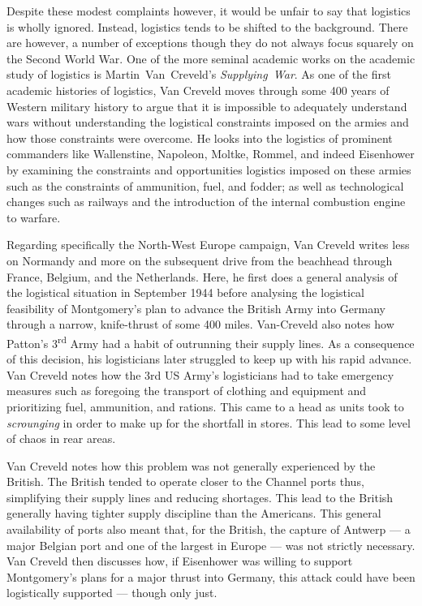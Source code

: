 \documentclass[noraggedright]{turabian-researchpaper}
\begin{document}
Despite these modest complaints however, it would be unfair to say that 
logistics is wholly ignored.  Instead, logistics tends to be shifted to the 
background.  There are however, a number of exceptions though they do not 
always focus squarely on the Second World War.  One of the more seminal 
academic works on the academic study of logistics is \mbox{Martin Van 
Creveld's} \mbox{\textit{Supplying War}}.  As one of the first academic 
histories of logistics, Van Creveld moves through some 400 years of Western 
military history to argue that it is impossible to adequately understand wars 
without understanding the logistical constraints imposed on the 
armies and how those constraints were overcome.\autocite[3]{sup-war}
He looks into the logistics of prominent commanders like Wallenstine, 
Napoleon, Moltke, Rommel, and indeed Eisenhower by examining the constraints 
and opportunities logistics imposed on these armies such as the constraints 
of ammunition, fuel, and fodder; as well as technological changes such as
railways and the introduction of the internal combustion engine to 
warfare.\autocite[1-3, 81-2, 86-96, 124-8, 234-5]{sup-war} 

Regarding specifically the North-West Europe campaign, Van Creveld writes 
less on Normandy and more on the subsequent drive from the beachhead through
France, Belgium, and the Netherlands.  Here, he first does a general
analysis of the logistical situation in September 1944 before analysing the
logistical feasibility of Montgomery's plan to advance the British Army into
Germany through a narrow, knife-thrust of some 400 miles.  
Van-Creveld also notes how Patton's 3\textsuperscript{rd} Army had a habit of 
outrunning
their supply lines.  As a consequence of this decision, his logisticians later
struggled to keep up with his rapid advance.  Van Creveld notes how the 3rd US 
Army's logisticians had to take emergency measures such as foregoing the 
transport of clothing and equipment and prioritizing fuel, ammunition, and 
rations.\autocite[217-22]{sup-war} This came to a head as units took to 
\textit{scrounging} in order to make up for the shortfall in stores. This 
lead to some level of chaos in rear areas. 

Van Creveld notes how this problem was not generally experienced by the 
British.  The British tended to operate closer to the Channel ports thus,
simplifying their supply lines and reducing shortages.  This 
lead to the British generally having tighter supply discipline than the 
Americans.\autocite[221--2]{sup-war}
This general availability of ports also meant that, for the British, the 
capture of Antwerp --- a major Belgian port and one of the largest in Europe 
--- was not strictly necessary.\autocite[223--5]{sup-war}
Van Creveld then discusses how, if Eisenhower was willing to support 
Montgomery's plans for a major thrust into Germany, this attack could have 
been logistically supported --- though only just.\autocite[227]{sup-war}
\end{document}
